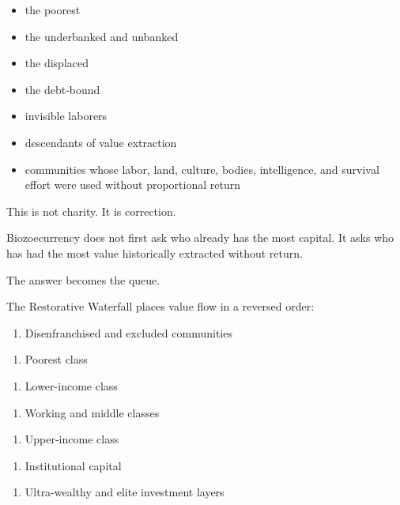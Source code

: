 ﻿\documentclass[12pt]{article}
\begin{document}
\begin{itemize}
  \item the poorest
\end{itemize}
\begin{itemize}
  \item the underbanked and unbanked
\end{itemize}
\begin{itemize}
  \item the displaced
\end{itemize}
\begin{itemize}
  \item the debt-bound
\end{itemize}
\begin{itemize}
  \item invisible laborers
\end{itemize}
\begin{itemize}
  \item descendants of value extraction
\end{itemize}
\begin{itemize}
  \item communities whose labor, land, culture, bodies, intelligence, and survival effort were used without proportional return
\end{itemize}

This is not charity. It is correction.

Biozoecurrency does not first ask who already has the most capital. It asks who has had the most value historically extracted without return.

The answer becomes the queue.

The Restorative Waterfall places value flow in a reversed order:

\begin{enumerate}
  \item Disenfranchised and excluded communities
\end{enumerate}
\begin{enumerate}
  \item Poorest class
\end{enumerate}
\begin{enumerate}
  \item Lower-income class
\end{enumerate}
\begin{enumerate}
  \item Working and middle classes
\end{enumerate}
\begin{enumerate}
  \item Upper-income class
\end{enumerate}
\begin{enumerate}
  \item Institutional capital
\end{enumerate}
\begin{enumerate}
  \item Ultra-wealthy and elite investment layers
\end{enumerate}
\end{document}
